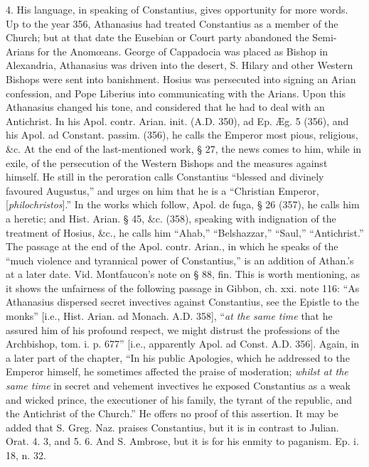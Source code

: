4. His language, in speaking of Constantius,
gives opportunity for more words. Up to the year 356, Athanasius had
treated Constantius as a member of the Church; but at that date the
Eusebian or Court party abandoned the Semi-Arians for the Anomœans.
George of Cappadocia was placed as Bishop in Alexandria, Athanasius
was driven into the desert, S. Hilary and other Western Bishops were
sent into banishment. Hosius was persecuted into signing an Arian
confession, and Pope Liberius into communicating with the Arians. Upon
this Athanasius changed his tone, and considered that he had to deal
with an Antichrist. In his Apol. contr. Arian. init. (A.D.
350), ad Ep. Æg. 5 (356), and his Apol. ad Constant. passim. (356),
he calls the Emperor most pious, religious, \&c. At the end of
the last-mentioned work, § 27, the news comes to him, while in exile,
of the persecution of the Western Bishops and the measures against
himself. He still in the peroration calls Constantius ``blessed and
divinely favoured Augustus,'' and urges on him that he is a ``Christian
Emperor, [\emph{philochristos}].'' In the works which follow, Apol. de
fuga, § 26 (357), he calls him a heretic; and Hist. Arian. § 45,
\&c. (358), speaking with indignation of the treatment of Hosius,
\&c., he calls him ``Ahab,'' ``Belshazzar,'' ``Saul,'' ``Antichrist.'' The
passage at the end of the Apol. contr. Arian., in which he speaks of
the ``much violence and tyrannical power of Constantius,'' is an
addition of Athan.'s at a later date. Vid. Montfaucon's note on § 88,
fin. This is worth mentioning, as it shows the unfairness of the
following passage in Gibbon, ch. xxi. note 116: ``As Athanasius
dispersed secret invectives against Constantius, see the Epistle to
the monks'' [i.e., Hist. Arian. ad Monach. A.D.
358], ``\emph{at the same time} that he assured him of his profound respect,
we might distrust the professions of the Archbishop, tom. i. p. 677''
[i.e., apparently Apol. ad Const. A.D.
356]. Again, in a later part of the chapter, ``In his public Apologies,
which he addressed to the Emperor himself, he sometimes affected the
praise of moderation; \emph{whilst at the same time} in secret and
vehement invectives he exposed Constantius as a weak and wicked
prince, the executioner of his family, the tyrant of the republic, and
the Antichrist of the Church.'' He offers no proof of this assertion.
It may be added that S. Greg. Naz. praises Constantius, but it is
in contrast to Julian. Orat. 4. 3, and 5. 6. And S. Ambrose, but it is
for his enmity to paganism. Ep. i. 18, n. 32.

